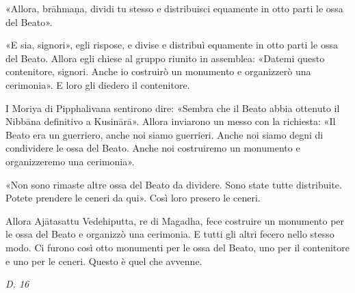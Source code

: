 «Allora, brāhmaṇa, dividi tu stesso e distribuisci equamente in otto
parti le ossa del Beato».


«E sia, signori», egli rispose, e divise e distribuì equamente in otto
parti le ossa del Beato. Allora egli chiese al gruppo riunito in
assemblea: «Datemi questo contenitore, signori. Anche io costruirò un
monumento e organizzerò una cerimonia». E loro gli diedero il
contenitore.


I Moriya di Pipphalivana sentirono dire: «Sembra che il Beato abbia
ottenuto il Nibbāna definitivo a Kusinārā». Allora inviarono un messo
con la richiesta: «Il Beato era un guerriero, anche noi siamo guerrieri.
Anche noi siamo degni di condividere le ossa del Beato. Anche noi
costruiremo un monumento e organizzeremo una cerimonia».


«Non sono rimaste altre ossa del Beato da dividere. Sono state tutte
distribuite. Potete prendere le ceneri da qui». Così loro presero le
ceneri.


Allora Ajātasattu Vedehiputta, re di Magadha, fece costruire un
monumento per le ossa del Beato e organizzò una cerimonia. E tutti gli
altri fecero nello stesso modo. Ci furono così otto monumenti per le
ossa del Beato, uno per il contenitore e uno per le ceneri. Questo è
quel che avvenne.


\emph{D. 16}


